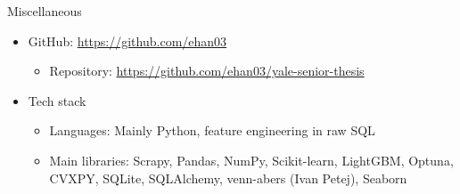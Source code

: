\documentclass[aspectratio=169,xcolor=dvipsnames]{beamer}
\begin{document}

\begin{frame}{Miscellaneous}
    \begin{itemize}
        \item GitHub: \url{https://github.com/ehan03}
        \begin{itemize}
            \item Repository: \url{https://github.com/ehan03/yale-senior-thesis}
        \end{itemize}

        \item Tech stack
        \begin{itemize}
            \item Languages: Mainly Python, feature engineering in raw SQL

            \item Main libraries: Scrapy, Pandas, NumPy, Scikit-learn, LightGBM, Optuna, CVXPY, SQLite, SQLAlchemy, venn-abers (Ivan Petej), Seaborn
        \end{itemize}
    \end{itemize}
\end{frame}

\end{document}
